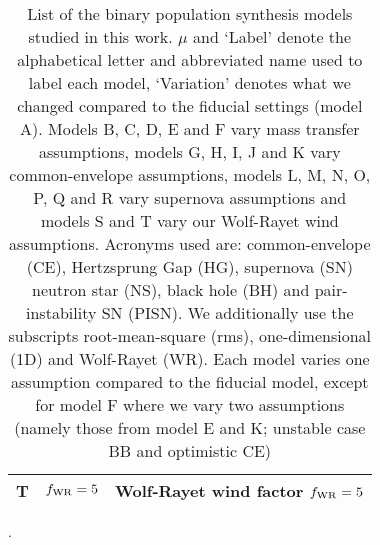 \begin{table}
\begin{tabular}{|l|l|l|}
%
T       &$f_{\rm{WR}}=5$	                 				& Wolf-Rayet wind factor $f_{\rm{WR}} = 5$\\%
%
\hline \hline
\end{tabular}
\caption{
List of the \NmodelsBPS binary population synthesis models studied in this work. 
$\mu$ and `Label' denote the alphabetical letter and abbreviated name used to label each model,  `Variation' denotes what we changed compared to the fiducial settings (model A). 
%
Models B, C, D, E and F vary mass transfer assumptions, models G, H, I, J and K vary common-envelope assumptions, models L, M, N, O, P, Q and R vary supernova assumptions and models S and T vary our Wolf-Rayet wind assumptions. Acronyms used are: common-envelope (CE), Hertzsprung Gap (HG), supernova (SN) neutron star (NS), black hole (BH) and pair-instability SN (PISN). We additionally use the subscripts root-mean-square (rms), one-dimensional (1D) and  Wolf-Rayet (WR). Each model varies one assumption compared to the fiducial model, except for model F where we vary two assumptions (namely those from model E and K; unstable case BB and optimistic CE)}.
\label{tab:variations-BPS}
\end{table}










